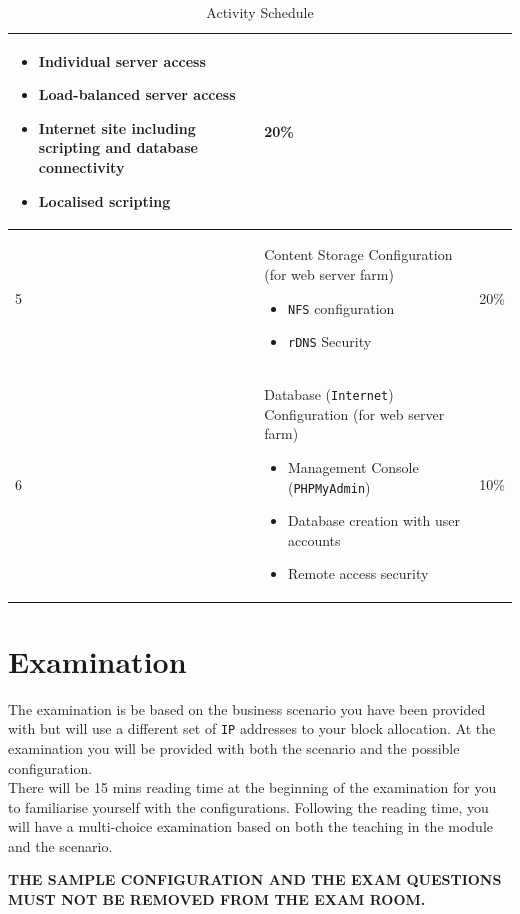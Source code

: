\documentclass[11pt]{article}
\begin{document}
\begin{table}[ht]
\begin{tabular}{|p{1cm}|p{14cm}|p{1cm}|}
\begin{itemize}
              \item Individual server access
              \item Load-balanced server access
              \item Internet site including scripting and database connectivity
              \item Localised scripting
            \end{itemize} 
      & 20\%\\
      \hline
      5 & Content Storage Configuration (for web server farm)
          \begin{itemize}
            \item \texttt{NFS} configuration
            \item \texttt{rDNS} Security
          \end{itemize} 
      & 20\%\\
      \hline
      6 & Database (\texttt{Internet}) Configuration (for web server farm)
          \begin{itemize}
            \item Management Console (\texttt{PHPMyAdmin})
            \item Database creation with user accounts
            \item Remote access security
          \end{itemize}
      & 10\%\\
      \hline
    \end{tabular}
    \caption{Activity Schedule}
\end{table}

\section{Examination}

\noindent The examination is be based on the business scenario you have been provided with but will use a different set of \texttt{IP} 
addresses to your block allocation. At the examination you will be provided with both the scenario and the possible configuration.\\

\noindent There will be 15 mins reading time at the beginning of the examination for you to familiarise yourself with the configurations. 
Following the reading time, you will have a multi-choice examination based on both the teaching in the module and the scenario.\\

\begin{tcolorbox}[title={\textbf{NOTE:}}]
  \noindent \textbf{THE SAMPLE CONFIGURATION AND THE EXAM QUESTIONS MUST NOT BE REMOVED FROM THE EXAM ROOM.}
\end{tcolorbox}
\end{document}
